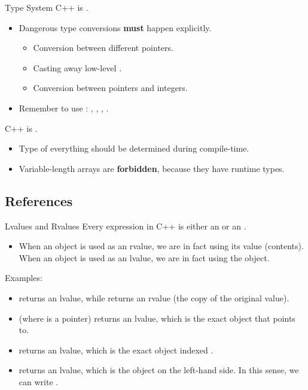 \documentclass{beamer}
\begin{document}
\begin{frame}{Type System}
    C++ is .
    \begin{itemize}
        \item Dangerous type conversions \textbf{must} happen explicitly.
        \pause
        \begin{itemize}
            \item Conversion between different pointers.
            \item Casting away low-level .
            \item Conversion between pointers and integers.
        \end{itemize}
        \pause
        \item Remember to use : , , , .
    \end{itemize}
    \pause
    C++ is .
    \begin{itemize}
        \item Type of everything should be determined during compile-time.
        \item Variable-length arrays are \textbf{forbidden}, because they have runtime types.
    \end{itemize}
\end{frame}

\subsection{References}

\begin{frame}{Lvalues and Rvalues}
    Every expression in C++ is either an  or an .
    \begin{itemize}
        \item When an object is used as an rvalue, we are in fact using its value (contents). When an object is used as an lvalue, we are in fact using the object.
    \end{itemize}
    \pause
    Examples:
    \begin{itemize}
        \item {} returns an lvalue, while  returns an rvalue (the copy of the original value).
        \pause
        \item {} (where  is a pointer) returns an lvalue, which is the exact object that  points to.
        \item {} returns an lvalue, which is the exact object indexed .
        \pause
        \item {} returns an lvalue, which is the object on the left-hand side. In this sense, we can write .
    \end{itemize}
\end{frame}
\end{document}
